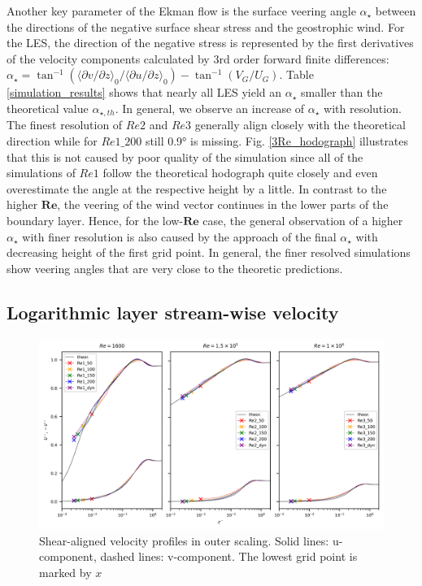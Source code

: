 \documentclass[a4paper,11pt]{article}
\newcommand{\RE}{\mathbf{Re}}
\begin{document}
Another key parameter of the Ekman flow is the surface veering angle $\alpha_\star$ between the directions of the negative surface shear stress and the geostrophic wind. For the LES, the direction of the negative stress is represented by the first derivatives of the velocity components calculated by 3rd order forward finite differences: $\alpha_\star = \tan^{-1}(\langle \partial v/\partial z\rangle_0/\langle \partial u/\partial z\rangle_0)-\tan^{-1}(V_G/U_G)$. Table \ref{simulation_results} shows that nearly all LES yield an $\alpha_\star$ smaller than the theoretical value $\alpha_{\star,th}$. In general, we observe an increase of $\alpha_\star$ with resolution. The finest resolution of $Re2$ and $Re3$ generally align closely with the theoretical direction while for $Re1\_200$ still 0.9° is missing. Fig. \ref{3Re_hodograph} illustrates that this is not caused by poor quality of the simulation since all of the simulations of $Re1$ follow the theoretical hodograph quite closely and even overestimate the angle at the respective height by a little. In contrast to the higher $\RE$, the veering of the wind vector continues in the lower parts of the boundary layer. Hence, for the low-$\RE$ case, the general observation of a higher $\alpha_\star$ with finer resolution is also caused by the approach of the final $\alpha_\star$ with decreasing height of the first grid point. In general, the finer resolved simulations show veering angles that are very close to the theoretic predictions.

\subsection{Logarithmic layer stream-wise velocity}
\label{vel_profiles}

\begin{figure}[ht]
  \centerline{
	\includegraphics[width=\textwidth]{figures_2024/d3y_3Re_profiles_outer.png}
	}
  \caption{Shear-aligned velocity profiles in outer scaling. Solid lines: u-component, dashed lines: v-component. The lowest grid point is marked by $x$}
  \label{velocity_outer}
\end{figure}
\end{document}
